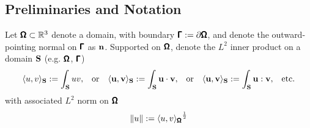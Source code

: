 \subsection*{Preliminaries and Notation}

    Let $\pmb{\mathsf{\Omega}}  \subset  \mathbb{R}^{3}$ denote a  domain, with boundary $\pmb{\mathsf{\Gamma}}  :=  \partial\pmb{\mathsf{\Omega}}$, and denote the outward-pointing normal on $\pmb{\mathsf{\Gamma}}$ as $\mathbf{n}$. Supported on $\pmb{\mathsf{\Omega}}$, denote the $L^{2}$ inner product on a domain $\mathbf{S}$ (e.g. $\pmb{\mathsf{\Omega}}$, $\pmb{\mathsf{\Gamma}}$)
    \begin{align}
        \langle u, v\rangle_{\mathbf{S}}  :=  \int_{\mathbf{S}}uv,  &&
        \text{or}  &&
        \langle \mathbf{u}, \mathbf{v}\rangle_{\mathbf{S}}  :=  \int_{\mathbf{S}}\mathbf{u}\cdot\mathbf{v},  &&
        \text{or}  &&
        \langle \mathbf{u}, \mathbf{v}\rangle_{\mathbf{S}}  :=  \int_{\mathbf{S}}\mathbf{u}:\mathbf{v},  &&
        \text{etc.}
    \end{align}
    with associated $L^{2}$ norm on $\pmb{\mathsf{\Omega}}$
    \begin{equation}
        \|u\|  :=  {\langle u, v\rangle_{\pmb{\mathsf{\Omega}}}}^{\frac{1}{2}}
    \end{equation}
    
